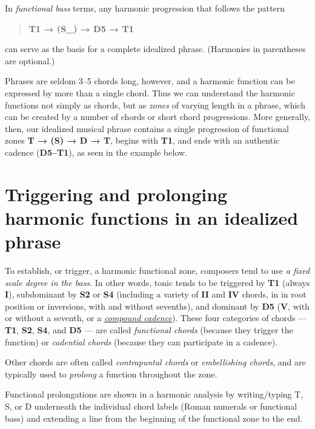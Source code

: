 \documentclass{book}
\begin{document}
In \emph{functional bass} terms, any harmonic progression that follows the
pattern

\begin{quote}
\textbf{T1 → (S\_) → D5 → T1}
\end{quote}

can serve as the basis for a complete idealized phrase. (Harmonies in
parentheses are optional.)

Phrases are seldom 3--5 chords long, however, and a harmonic function can be
expressed by more than a single chord. Thus we can understand the harmonic
functions not simply as chords, but as \emph{zones} of varying length in a
phrase, which can be created by a number of chords or short chord
progressions. More generally, then, our idealized musical phrase contains a
single progression of functional zones \textbf{T → (S) → D → T}, begins with
\textbf{T1}, and ends with an authentic cadence (\textbf{D5--T1}), as seen in
the example below.

\hypertarget{triggering-and-prolonging-harmonic-functions-in-an-idealized-phrase}{%
\section{Triggering and prolonging harmonic functions in an idealized
phrase}\label{triggering-and-prolonging-harmonic-functions-in-an-idealized-phrase}}

To establish, or trigger, a harmonic functional zone, composers tend to use
\emph{a fixed scale degree in the bass}. In other words, tonic tends to be
triggered by \textbf{T1} (always \textbf{I}), subdominant by \textbf{S2} or
\textbf{S4} (including a variety of \textbf{II} and \textbf{IV} chords, in in
root position or inversions, with and without sevenths), and dominant by
\textbf{D5} (\textbf{V}, with or without a seventh, or a
\href{cadenceTypes}{\emph{compound cadence}}). These four categories of chords
--- \textbf{T1}, \textbf{S2}, \textbf{S4}, and \textbf{D5} --- are called
\emph{functional chords} (because they trigger the function) or
\emph{cadential chords} (because they can participate in a cadence).

Other chords are often called \emph{contrapuntal chords} or \emph{embellishing
chords}, and are typically used to \emph{prolong} a function throughout the
zone.

Functional prolongations are shown in a harmonic analysis by writing/typing T,
S, or D underneath the individual chord labels (Roman numerals or functional
bass) and extending a line from the beginning of the functional zone to the
end.
\end{document}
